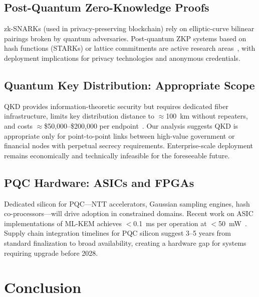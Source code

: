 \documentclass[journal]{IEEEtran}
\begin{document}
\subsection{Post-Quantum Zero-Knowledge Proofs}

zk-SNARKs (used in privacy-preserving blockchain) rely on elliptic-curve
bilinear pairings broken by quantum adversaries. Post-quantum ZKP systems
based on hash functions (STARKs) or lattice commitments are active research
areas~\cite{boneh2020lattice}, with deployment implications for privacy
technologies and anonymous credentials.

\subsection{Quantum Key Distribution: Appropriate Scope}

QKD provides information-theoretic security but requires dedicated fiber
infrastructure, limits key distribution distance to $\approx$100~km without
repeaters, and costs $\approx$\$50,000--\$200,000 per endpoint~\cite{pirandola2020advances}.
Our analysis suggests QKD is appropriate only for point-to-point links between
high-value government or financial nodes with perpetual secrecy requirements.
Enterprise-scale deployment remains economically and technically infeasible
for the foreseeable future.

\subsection{PQC Hardware: ASICs and FPGAs}

Dedicated silicon for PQC---NTT accelerators, Gaussian sampling engines,
hash co-processors---will drive adoption in constrained domains. Recent work
on ASIC implementations of ML-KEM achieves $<$0.1~ms per operation at
$<$50~mW~\cite{ngo2021hardware}. Supply chain integration timelines for
PQC silicon suggest 3--5 years from standard finalization to broad availability,
creating a hardware gap for systems requiring upgrade before 2028.

\section{Conclusion}
\label{sec:conclusion}
\end{document}
